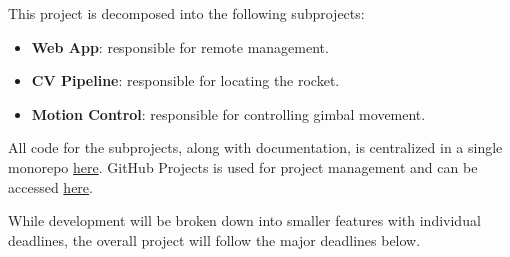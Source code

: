 \documentclass{article}
\begin{document}
This project is decomposed into the following subprojects:

\begin{itemize}
  \item \textbf{Web App}: responsible for remote management.
  \item \textbf{CV Pipeline}: responsible for locating the rocket.
  \item \textbf{Motion Control}: responsible for controlling gimbal movement.
\end{itemize}

All code for the subprojects, along with documentation, is centralized in a
single monorepo \href{https://github.com/ZifanSi/vision-guided-tracker}{here}.
GitHub Projects is used for project management and can be accessed
\href{https://github.com/users/ZifanSi/projects/1}{here}.

While development will be broken down into smaller features with individual
deadlines, the overall project will follow the major deadlines below.
\end{document}
